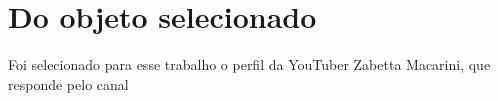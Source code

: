 \section{Do objeto selecionado}

Foi selecionado para esse trabalho o perfil da YouTuber Zabetta Macarini, que responde pelo canal